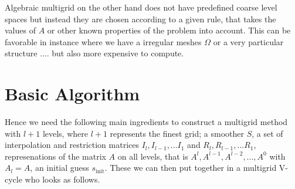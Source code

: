 \documentclass[../draft_1.tex]{subfiles}
\begin{document}
Algebraic multigrid on the other hand does not have predefined coarse level spaces but instead they are chosen according to a given rule, that takes the values of $A$ or other known properties of the problem into account. This can be favorable in instance where we have a irregular meshes $\Omega$ or a very particular structure  .... but also more expensive to compute. 


\section{Basic Algorithm} 


Hence we need the following main ingredients to construct a multigrid method with $l+1$ levels, where $l+1$ represents the finest grid; a smoother $S$, a set of interpolation and restriction matrices $I_l, I_{l-1}, ...I_1$ and $R_l, R_{l-1}, ... R_1$, represenations of the matrix $A$ on all levels, that is $A^l, A^{l-1}, A^{l-2}, ..., A^0$ with $A_l = A$, an initial guess $s_{\text{init}}$. These we can then put together in a multigrid V-cycle who looks as follows. 
\end{document}
